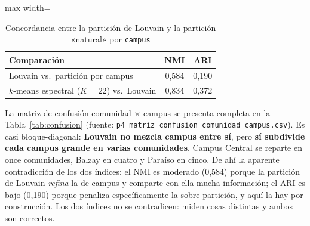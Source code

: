 \documentclass[10pt,a4paper]{extarticle}
\newcommand{\code}[1]{\texttt{\small #1}}
\begin{document}
\begin{table}[H]
\centering
\caption{Concordancia entre la partición de Louvain y la partición «natural» por \code{campus}}
\label{tab:nmiari}
\small
\begin{adjustbox}{max width=\textwidth}
\begin{tabular}{lcc}
\toprule
\textbf{Comparación} & \textbf{NMI} & \textbf{ARI} \\
\midrule
Louvain vs.\ partición por campus            & 0,584 & 0,190 \\
$k$-means espectral ($K=22$) vs.\ Louvain    & 0,834 & 0,372 \\
\bottomrule
\end{tabular}
\end{adjustbox}
\end{table}

La matriz de confusión comunidad $\times$ campus se presenta completa en la
Tabla~\ref{tab:confusion} (fuente: \code{p4\_matriz\_confusion\_comunidad\_campus.csv}). Es
casi bloque-diagonal: \textbf{Louvain no mezcla campus entre sí}, pero \textbf{sí subdivide
cada campus grande en varias comunidades}. Campus Central se reparte en once comunidades,
Balzay en cuatro y Paraíso en cinco. De ahí la aparente contradicción de los dos índices: el
NMI es moderado (0,584) porque la partición de Louvain \textit{refina} la de campus y
comparte con ella mucha información; el ARI es bajo (0,190) porque penaliza específicamente
la sobre-partición, y aquí la hay por construcción. Los dos índices no se contradicen: miden
cosas distintas y ambos son correctos.
\end{document}
